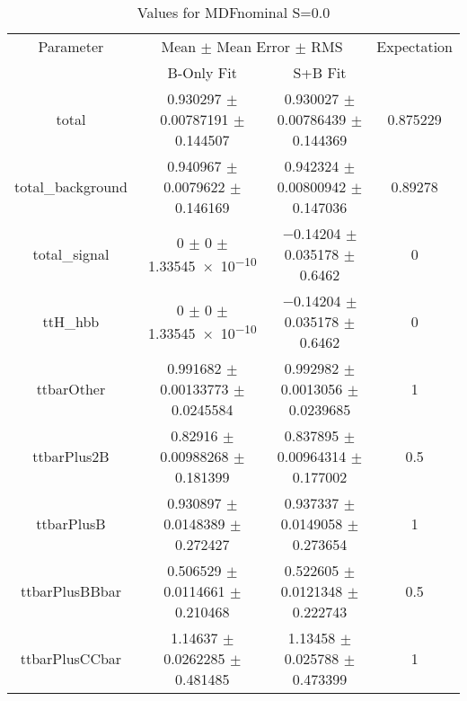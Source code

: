 \begin{table}
\centering
\caption{Values for MDFnominal S=0.0}
\begin{tabular}{cccc}
\toprule
Parameter & \multicolumn{2}{c}{Mean $\pm$ Mean Error $\pm$ RMS} & Expectation\\
 & B-Only Fit & S+B Fit & \\
\midrule
total & \num{0.930297} $\pm$ \num{0.00787191} $\pm$ \num{0.144507} & \num{0.930027} $\pm$ \num{0.00786439} $\pm$ \num{0.144369} & \num{0.875229}\\
total\_background & \num{0.940967} $\pm$ \num{0.0079622} $\pm$ \num{0.146169} & \num{0.942324} $\pm$ \num{0.00800942} $\pm$ \num{0.147036} & \num{0.89278}\\
total\_signal & \num{0} $\pm$ \num{0} $\pm$ \num{1.33545e-10} & \num{-0.14204} $\pm$ \num{0.035178} $\pm$ \num{0.6462} & \num{0}\\
ttH\_hbb & \num{0} $\pm$ \num{0} $\pm$ \num{1.33545e-10} & \num{-0.14204} $\pm$ \num{0.035178} $\pm$ \num{0.6462} & \num{0}\\
ttbarOther & \num{0.991682} $\pm$ \num{0.00133773} $\pm$ \num{0.0245584} & \num{0.992982} $\pm$ \num{0.0013056} $\pm$ \num{0.0239685} & \num{1}\\
ttbarPlus2B & \num{0.82916} $\pm$ \num{0.00988268} $\pm$ \num{0.181399} & \num{0.837895} $\pm$ \num{0.00964314} $\pm$ \num{0.177002} & \num{0.5}\\
ttbarPlusB & \num{0.930897} $\pm$ \num{0.0148389} $\pm$ \num{0.272427} & \num{0.937337} $\pm$ \num{0.0149058} $\pm$ \num{0.273654} & \num{1}\\
ttbarPlusBBbar & \num{0.506529} $\pm$ \num{0.0114661} $\pm$ \num{0.210468} & \num{0.522605} $\pm$ \num{0.0121348} $\pm$ \num{0.222743} & \num{0.5}\\
ttbarPlusCCbar & \num{1.14637} $\pm$ \num{0.0262285} $\pm$ \num{0.481485} & \num{1.13458} $\pm$ \num{0.025788} $\pm$ \num{0.473399} & \num{1}\\
\bottomrule
\end{tabular}
\end{table}